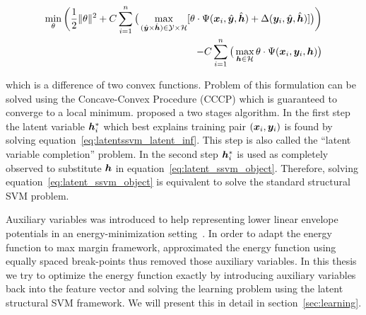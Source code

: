 \begin{align}
\label{eq:latent_ssvm_object}
  \min_\theta\bigg(\frac{1}{2}\|\theta\|^2+
  C\sum_{i=1}^{n}\big(\max_{(\hat{{\bm{y}}} \times
  \hat{{\bm{h}}}) \in \mathcal{Y} \times \mathcal{H}}
  [\theta\cdot\Psi({\bm{x}}_i,\hat{{\bm{y}}},\hat{{\bm{h}}}) +
  \Delta({\bm{y}}_i,\hat{{\bm{y}}},\hat{{\bm{h}}})]\big)\bigg)\\
  -C\sum_{i=1}^{n}\big(\max_{{\bm{h}} \in \mathcal{H}} \theta \cdot
  \Psi({\bm{x}}_i,{\bm{y}}_i,{\bm{h}})\big)\nonumber
\end{align}

\noindent which is a difference of two convex functions. Problem
of this formulation can be solved using the Concave-Convex
Procedure (CCCP)\cite{yuille2002concave} which is guaranteed to
converge to a local minimum.  proposed a
two stages algorithm. In the first step the latent variable
${\bm{h}}_i^*$ which best explains training pair $({\bm{x}}_i, {\bm{y}}_i)$ is
found by solving equation~\eqref{eq:latentssvm_latent_inf}. This
step is also called the ``latent variable completion'' problem.
In the second step ${\bm{h}}_i^*$ is used as completely observed to
substitute ${\bm{h}}$ in equation~\eqref{eq:latent_ssvm_object}.
Therefore, solving equation~\eqref{eq:latent_ssvm_object} is
equivalent to solve the standard structural SVM problem.

Auxiliary variables was introduced to help representing lower
linear envelope potentials in an energy-minimization
setting~\cite{Kohli:CVPR10}. In order to adapt the energy
function to max margin framework, 
approximated the energy function using equally spaced
break-points thus removed those auxiliary variables. In this
thesis we try to optimize the energy function exactly by
introducing auxiliary variables back into the feature vector and
solving the learning problem using the latent structural SVM
framework. We will present this in detail in
section~\ref{sec:learning}.


\clearpage
\cleardoublepage



